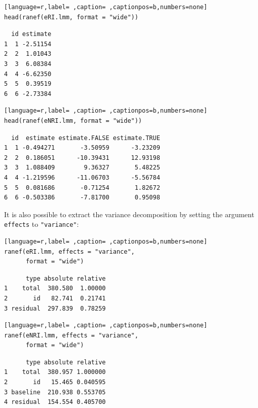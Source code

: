 \documentclass[12pt]{article}
\begin{document}
\bigskip

\begin{minipage}{0.48\linewidth}
\begin{lstlisting}[language=r,label= ,caption= ,captionpos=b,numbers=none]
head(ranef(eRI.lmm, format = "wide"))
\end{lstlisting}

\begin{verbatim}
  id estimate
1  1 -2.51154
2  2  1.01043
3  3  6.08384
4  4 -6.62350
5  5  0.39519
6  6 -2.73384
\end{verbatim}

\end{minipage}
\begin{minipage}{0.48\linewidth}
\begin{lstlisting}[language=r,label= ,caption= ,captionpos=b,numbers=none]
head(ranef(eNRI.lmm, format = "wide"))
\end{lstlisting}

\begin{verbatim}
  id  estimate estimate.FALSE estimate.TRUE
1  1 -0.494271       -3.50959      -3.23209
2  2  0.186051      -10.39431      12.93198
3  3  1.088409        9.36327       5.48225
4  4 -1.219596      -11.06703      -5.56784
5  5  0.081686       -0.71254       1.82672
6  6 -0.503386       -7.81700       0.95098
\end{verbatim}

\end{minipage}


It is also possible to extract the variance decomposition by setting
the argument \texttt{effects} to \texttt{"variance"}:

\medskip

\begin{minipage}{0.47\linewidth}
\begin{lstlisting}[language=r,label= ,caption= ,captionpos=b,numbers=none]
ranef(eRI.lmm, effects = "variance",
      format = "wide")
\end{lstlisting}

\begin{verbatim}
      type absolute relative
1    total  380.580  1.00000
2       id   82.741  0.21741
3 residual  297.839  0.78259

\end{verbatim}

\end{minipage}
\begin{minipage}{0.47\linewidth}
\begin{lstlisting}[language=r,label= ,caption= ,captionpos=b,numbers=none]
ranef(eNRI.lmm, effects = "variance",
      format = "wide")
\end{lstlisting}

\begin{verbatim}
      type absolute relative
1    total  380.957 1.000000
2       id   15.465 0.040595
3 baseline  210.938 0.553705
4 residual  154.554 0.405700
\end{verbatim}

\end{minipage}
\end{document}
